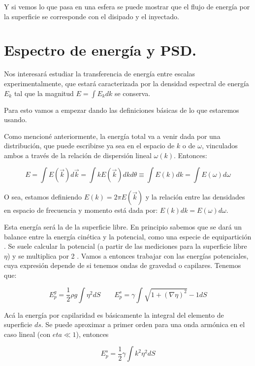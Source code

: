 Y si vemos lo que pasa en una esfera se puede mostrar que el flujo de energía por la superficie se corresponde con el disipado y el inyectado. \cite{falkovichTurbulence2006}

\section{Espectro de energía y PSD.}
Nos interesará estudiar la transferencia de energía entre escalas experimentalmente, que estará caracterizada por la densidad espectral de energía $E_k$ tal que la magnitud $E = \int E_k dk$ se conserva. 

Para esto vamos a empezar dando las definiciones básicas de lo que estaremos usando.

Como mencioné anteriormente, la energía total va a venir dada por una distribución, que puede escribirse ya sea en el espacio de $k$ o de $\omega$, vinculados ambos a través de la relación de dispersión lineal $\omega(k)$. Entonces:

\begin{equation}
	E = \int E(\vec k) d\vec k = \int k E(\vec k) dkd\theta \equiv \int E(k) dk = \int E(\omega) d\omega
\end{equation}

O sea, estamos definiendo $E(k) = 2\pi E(\vec k)$ y la relación entre las densidades en espacio de frecuencia y momento está dada por: $E(k) dk = E(\omega) d\omega$.

Esta energía será la de la superficie libre. En principio sabemos que se dará un balance entre la energía cinética y la potencial, como una especie de equipartición \cite{kunduFluidMechanics2014}. Se suele calcular la potencial (a partir de las mediciones para la superficie libre $\eta$) y se multiplica por 2 \cite{deikeEtudesExperimentalesNumeriques2013}. Vamos a entonces trabajar con las energías potenciales, cuya expresión depende de si tenemos ondas de gravedad o capilares. Tenemos que:

\begin{equation}
	E_p^g = \frac{1}{2} \rho g \int \eta^2 dS \qquad E_p^s = \gamma \int\sqrt{1+(\nabla\eta)^2} - 1 dS
\end{equation}

Acá la energía por capilaridad es básicamente la integral del elemento de superficie $ds$. Se puede aproximar a primer orden para una onda armónica en el caso lineal (con $eta\ll1$), entonces \cite{deikeEtudesExperimentalesNumeriques2013}

\begin{equation}
	E_p^s = \frac{1}{2} \gamma\int k^2\eta^2dS
\end{equation}

